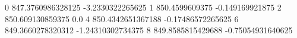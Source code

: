 0 847.3760986328125 -3.2330322265625
1 850.4599609375 -0.149169921875
2 850.609130859375 0.0
4 850.4342651367188 -0.17486572265625
6 849.3660278320312 -1.24310302734375
8 849.8585815429688 -0.75054931640625
